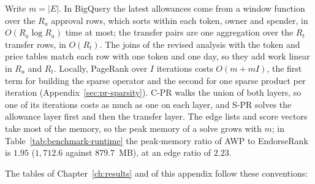
Write $m=|E|$. In BigQuery the latest allowances come from a window function over the $R_a$ approval rows, which sorts within each token, owner and spender, in $O(R_a\log R_a)$ time at most; the transfer pairs are one aggregation over the $R_t$ transfer rows, in $O(R_t)$. The joins of the revised analysis with the token and price tables match each row with one token and one day, so they add work linear in $R_a$ and $R_t$. Locally, PageRank over $I$ iterations costs $O(m+mI)$, the first term for building the sparse operator and the second for one sparse product per iteration (Appendix~\ref{sec:pr-sparsity}). C-PR walks the union of both layers, so one of its iterations costs as much as one on each layer, and S-PR solves the allowance layer first and then the transfer layer. The edge lists and score vectors take most of the memory, so the peak memory of a solve grows with $m$; in Table~\ref{tab:benchmark-runtime} the peak-memory ratio of AWP to EndorseRank is $1.95$ ($1{,}712.6$ against $879.7$~MB), at an edge ratio of $2.23$.


The tables of Chapter~\ref{ch:results} and of this appendix follow these conventions:

